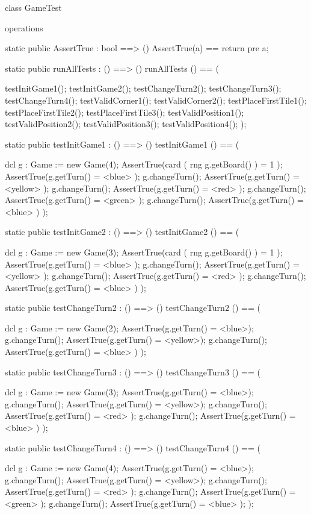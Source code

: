 \begin{vdm_al}
class GameTest

 operations
 
 static public AssertTrue : bool ==> ()
  AssertTrue(a) == return
    pre a;

 static public runAllTests : () ==> ()
  runAllTests () == (
  
   testInitGame1();
   testInitGame2();
   testChangeTurn2();
   testChangeTurn3();
   testChangeTurn4();
   testValidCorner1();
   testValidCorner2();
   testPlaceFirstTile1();
   testPlaceFirstTile2();
   testPlaceFirstTile3();
   testValidPosition1();
   testValidPosition2();
   testValidPosition3();
   testValidPosition4();
  );

 static public testInitGame1 : () ==> ()
 testInitGame1 () == (
  
  dcl g : Game := new Game(4);
  AssertTrue(card ( rng g.getBoard() ) = 1 );
  AssertTrue(g.getTurn() = <blue> );
  g.changeTurn();
  AssertTrue(g.getTurn() = <yellow> );
  g.changeTurn();
  AssertTrue(g.getTurn() = <red> );
  g.changeTurn();
  AssertTrue(g.getTurn() = <green> );
  g.changeTurn();
  AssertTrue(g.getTurn() = <blue> )
 );
 
 static public testInitGame2 : () ==> ()
 testInitGame2 () == (
  
  dcl g : Game := new Game(3);
  AssertTrue(card ( rng g.getBoard() ) = 1 );
  AssertTrue(g.getTurn() = <blue> );
  g.changeTurn();
  AssertTrue(g.getTurn() = <yellow> );
  g.changeTurn();
  AssertTrue(g.getTurn() = <red> );
  g.changeTurn();
  AssertTrue(g.getTurn() = <blue> )
 );
 
 static public testChangeTurn2 : () ==> ()
 testChangeTurn2 () == (
  
  dcl g : Game := new Game(2);
  AssertTrue(g.getTurn() = <blue>);
  g.changeTurn();
  AssertTrue(g.getTurn() = <yellow>);
  g.changeTurn();
  AssertTrue(g.getTurn() = <blue> )
 );
 
 static public testChangeTurn3 : () ==> ()
 testChangeTurn3 () == (
  
  dcl g : Game := new Game(3);
  AssertTrue(g.getTurn() = <blue>);
  g.changeTurn();
  AssertTrue(g.getTurn() = <yellow>);
  g.changeTurn();
  AssertTrue(g.getTurn() = <red> );
  g.changeTurn();
  AssertTrue(g.getTurn() = <blue> )
 );
 
 static public testChangeTurn4 : () ==> ()
 testChangeTurn4 () == (
  
  dcl g : Game := new Game(4);
  AssertTrue(g.getTurn() = <blue>);
  g.changeTurn();
  AssertTrue(g.getTurn() = <yellow>);
  g.changeTurn();
  AssertTrue(g.getTurn() = <red> );
  g.changeTurn();
  AssertTrue(g.getTurn() = <green> );
  g.changeTurn();
  AssertTrue(g.getTurn() = <blue> );
 );
 

\end{vdm_al}
